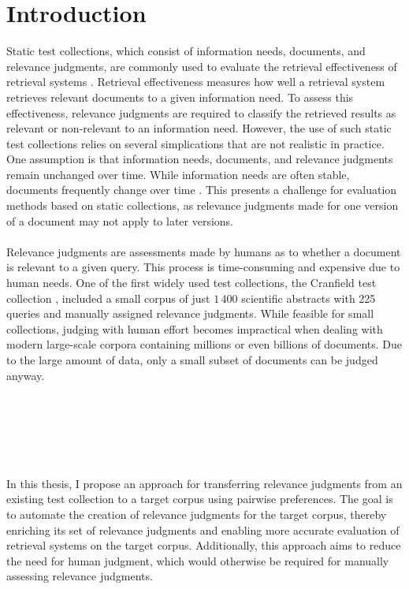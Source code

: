 \chapter{Introduction}\label{introduction} 

Static test collections, which consist of information needs, documents, and relevance judgments, are commonly used to evaluate the retrieval effectiveness of retrieval systems \cite{sanderson:2010}. Retrieval effectiveness measures how well a retrieval system retrieves relevant documents to a given information need. To assess this effectiveness, relevance judgments are required to classify the retrieved results as relevant or non-relevant to an information need. However, the use of such static test collections relies on several simplications that are not realistic in practice. One assumption is that information needs, documents, and relevance judgments remain unchanged over time. While information needs are often stable, documents frequently change over time \mbox{\cite{cho:2000}}. This presents a challenge for evaluation methods based on static collections, as relevance judgments made for one version of a document may not apply to later versions.
\\\\
Relevance judgments are assessments made by humans as to whether a document is relevant to a given query. This process is time-consuming and expensive due to human needs. One of the first widely used test collections, the Cranfield test collection \mbox{\cite{cleverdon:91}}, included a small corpus of just $1\,400$ scientific abstracts with 225 queries and manually assigned relevance judgments. While feasible for small collections, judging with human effort becomes impractical when dealing with modern large-scale corpora containing millions or even billions of documents. Due to the large amount of data, only a small subset of documents can be judged anyway. 
\\\\\\\\\\\\\\
In this thesis, I propose an approach for transferring relevance judgments from an existing test collection to a target corpus using pairwise preferences. The goal is to automate the creation of relevance judgments for the target corpus, thereby enriching its set of relevance judgments and enabling more accurate evaluation of retrieval systems on the target corpus. Additionally, this approach aims to reduce the need for human judgment, which would otherwise be \mbox{required} for manually assessing relevance judgments.
